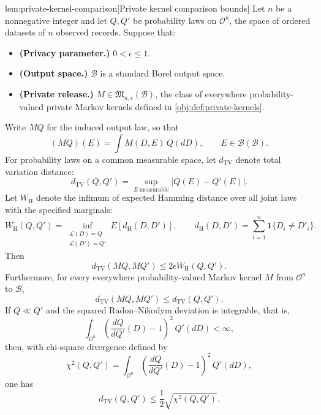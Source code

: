 \documentclass[11pt]{article}
\begin{document}
\begin{lemmav}{lem:private-kernel-comparison}[Private kernel comparison bounds]
Let \(n\) be a nonnegative integer and let \(Q,Q'\) be probability laws on \(\mathcal O^n\), the space of ordered datasets of \(n\) observed records. Suppose that:
\begin{itemize}
\item \textbf{(Privacy parameter.)} \(0<\epsilon\le 1\).
\item \textbf{(Output space.)} \(\mathcal B\) is a standard Borel output space.
\item \textbf{(Private release.)} \(M\in\mathfrak M_{n,\epsilon}(\mathcal B)\), the class of everywhere probability-valued private Markov kernels defined in \cref{obj:def:private-kernels}.
\end{itemize}
Write \(MQ\) for the induced output law, so that
\[
(MQ)(E)=\int M(D,E)\,Q(dD),
\qquad E\in\mathcal B(\mathcal B).
\]
For probability laws on a common measurable space, let \(d_{\mathrm{TV}}\) denote total variation distance:
\[
d_{\mathrm{TV}}(Q,Q')=\sup_{E\ \mathrm{measurable}}|Q(E)-Q'(E)|.
\]
Let \(W_{\mathrm H}\) denote the infimum of expected Hamming distance over all joint laws with the specified marginals:
\[
W_{\mathrm H}(Q,Q')
=
\inf_{\substack{\mathcal L(D)=Q\\\mathcal L(D')=Q'}}
E\!\left[d_{\mathrm H}(D,D')\right],
\qquad
d_{\mathrm H}(D,D')
=
\sum_{i=1}^{n}\mathbf 1\{D_i\ne D'_i\}.
\]
Then
\[
d_{\mathrm{TV}}(MQ,MQ')
\le 2\epsilon W_{\mathrm H}(Q,Q').
\]
Furthermore, for every everywhere probability-valued Markov kernel \(M\) from \(\mathcal O^n\) to \(\mathcal B\),
\[
d_{\mathrm{TV}}(MQ,MQ')\le d_{\mathrm{TV}}(Q,Q').
\]
If \(Q\ll Q'\) and the squared Radon--Nikodym deviation is integrable, that is,
\[
\int_{\mathcal O^n}
\left(\frac{dQ}{dQ'}(D)-1\right)^2\,Q'(dD)<\infty,
\]
then, with chi-square divergence defined by
\[
\chi^2(Q,Q')
=
\int_{\mathcal O^n}
\left(\frac{dQ}{dQ'}(D)-1\right)^2\,Q'(dD),
\]
one has
\[
d_{\mathrm{TV}}(Q,Q')
\le \frac12\sqrt{\chi^2(Q,Q')}.
\]
\end{lemmav}
\end{document}
